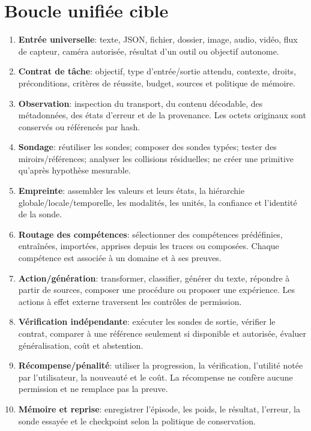 \documentclass[11pt,a4paper,oneside]{report}
\begin{document}
\section{Boucle unifiée cible}
\begin{enumerate}
\item \textbf{Entrée universelle}: texte, JSON, fichier, dossier, image, audio, vidéo, flux de capteur, caméra autorisée, résultat d'un outil ou objectif autonome.
\item \textbf{Contrat de tâche}: objectif, type d'entrée/sortie attendu, contexte, droits, préconditions, critères de réussite, budget, sources et politique de mémoire.
\item \textbf{Observation}: inspection du transport, du contenu décodable, des métadonnées, des états d'erreur et de la provenance. Les octets originaux sont conservés ou référencés par hash.
\item \textbf{Sondage}: réutiliser les sondes; composer des sondes typées; tester des miroirs/références; analyser les collisions résiduelles; ne créer une primitive qu'après hypothèse mesurable.
\item \textbf{Empreinte}: assembler les valeurs et leurs états, la hiérarchie globale/locale/temporelle, les modalités, les unités, la confiance et l'identité de la sonde.
\item \textbf{Routage des compétences}: sélectionner des compétences prédéfinies, entraînées, importées, apprises depuis les traces ou composées. Chaque compétence est associée à un domaine et à ses preuves.
\item \textbf{Action/génération}: transformer, classifier, générer du texte, répondre à partir de sources, composer une procédure ou proposer une expérience. Les actions à effet externe traversent les contrôles de permission.
\item \textbf{Vérification indépendante}: exécuter les sondes de sortie, vérifier le contrat, comparer à une référence seulement si disponible et autorisée, évaluer généralisation, coût et abstention.
\item \textbf{Récompense/pénalité}: utiliser la progression, la vérification, l'utilité notée par l'utilisateur, la nouveauté et le coût. La récompense ne confère aucune permission et ne remplace pas la preuve.
\item \textbf{Mémoire et reprise}: enregistrer l'épisode, les poids, le résultat, l'erreur, la sonde essayée et le checkpoint selon la politique de conservation.
\end{enumerate}
\end{document}
